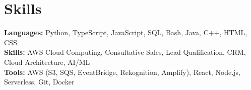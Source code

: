 \documentclass[11pt]{article}       %
\begin{document}

\vspace{-18.5pt}


\section*{Skills}
\textbf{Languages:} Python, TypeScript, JavaScript, SQL, Bash, Java, C++, HTML, CSS\\
\textbf{Skills:} AWS Cloud Computing, Consultative Sales, Lead Qualification, CRM, Cloud Architecture, AI/ML\\
\textbf{Tools:} AWS (S3, SQS, EventBridge, Rekognition, Amplify), React, Node.js, Serverless, Git, Docker\\

\vspace{-6.5pt}
\end{document}
